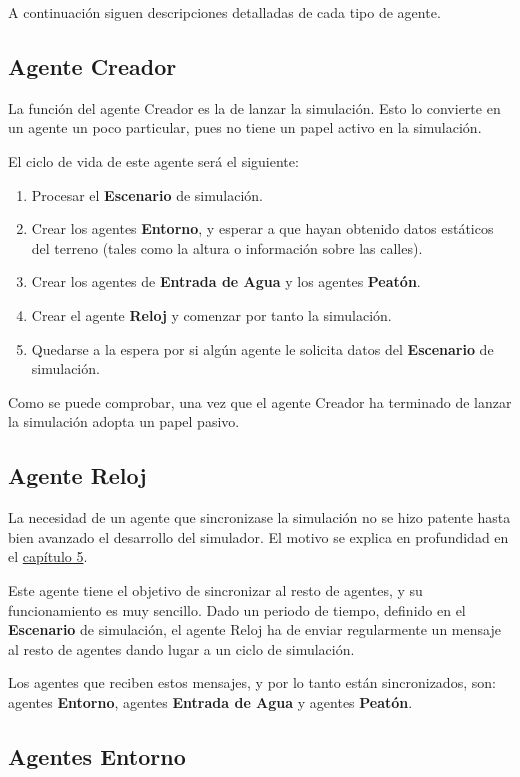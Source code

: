 A continuación siguen descripciones detalladas de cada tipo de agente.

\subsection*{Agente Creador}

La función del agente Creador es la de lanzar la simulación. Esto lo convierte
en un agente un poco particular, pues no tiene un papel activo en la
simulación.

El ciclo de vida de este agente será el siguiente:

\begin{enumerate}
 \item Procesar el {\bf Escenario} de simulación.
 \item Crear los agentes {\bf Entorno}, y esperar a que hayan obtenido datos
estáticos del terreno (tales como la altura o información sobre las calles).
 \item Crear los agentes de {\bf Entrada de Agua} y los agentes {\bf Peatón}.
 \item Crear el agente {\bf Reloj} y comenzar por tanto la simulación.
 \item Quedarse a la espera por si algún agente le solicita datos del
{\bf Escenario} de simulación.
\end{enumerate}

Como se puede comprobar, una vez que el agente Creador ha terminado de lanzar
la simulación adopta un papel pasivo.

\subsection*{Agente Reloj}

La necesidad de un agente que sincronizase la simulación no se hizo patente
hasta bien avanzado el desarrollo del simulador. El motivo se explica en
profundidad en el \hyperref[cap5]{capítulo 5}.

Este agente tiene el objetivo de sincronizar al resto de agentes, y su
funcionamiento es muy sencillo. Dado un periodo de tiempo, definido en el
{\bf Escenario} de simulación, el agente Reloj ha de enviar regularmente un
mensaje al resto de agentes dando lugar a un ciclo de simulación.

Los agentes que reciben estos mensajes, y por lo tanto están sincronizados,
son: agentes {\bf Entorno}, agentes {\bf Entrada de Agua} y agentes {\bf
Peatón}.

\subsection*{Agentes Entorno}

